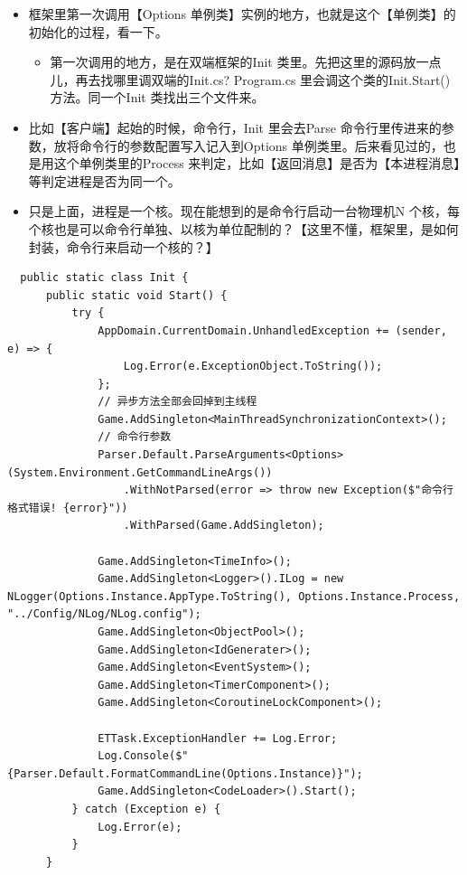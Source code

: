 \documentclass[9pt, b5paper]{article}
\begin{document}
\begin{itemize}
\item 框架里第一次调用【Options 单例类】实例的地方，也就是这个【单例类】的初始化的过程，看一下。
\begin{itemize}
\item 第一次调用的地方，是在双端框架的Init 类里。先把这里的源码放一点儿，再去找哪里调双端的Init.cs? Program.cs 里会调这个类的Init.Start() 方法。同一个Init 类找出三个文件来。
\end{itemize}
\item 比如【客户端】起始的时候，命令行，Init 里会去Parse 命令行里传进来的参数，放将命令行的参数配置写入记入到Options 单例类里。后来看见过的，也是用这个单例类里的Process 来判定，比如【返回消息】是否为【本进程消息】等判定进程是否为同一个。
\item 只是上面，进程是一个核。现在能想到的是命令行启动一台物理机N 个核，每个核也是可以命令行单独、以核为单位配制的？【这里不懂，框架里，是如何封装，命令行来启动一个核的？】
\end{itemize}
\begin{verbatim}
  public static class Init {
      public static void Start() {
          try {    
              AppDomain.CurrentDomain.UnhandledException += (sender, e) => {
                  Log.Error(e.ExceptionObject.ToString());
              };
              // 异步方法全部会回掉到主线程
              Game.AddSingleton<MainThreadSynchronizationContext>();
              // 命令行参数
              Parser.Default.ParseArguments<Options>(System.Environment.GetCommandLineArgs())
                  .WithNotParsed(error => throw new Exception($"命令行格式错误! {error}"))
                  .WithParsed(Game.AddSingleton);

              Game.AddSingleton<TimeInfo>();
              Game.AddSingleton<Logger>().ILog = new NLogger(Options.Instance.AppType.ToString(), Options.Instance.Process, "../Config/NLog/NLog.config");
              Game.AddSingleton<ObjectPool>();
              Game.AddSingleton<IdGenerater>();
              Game.AddSingleton<EventSystem>();
              Game.AddSingleton<TimerComponent>();
              Game.AddSingleton<CoroutineLockComponent>();

              ETTask.ExceptionHandler += Log.Error;
              Log.Console($"{Parser.Default.FormatCommandLine(Options.Instance)}");
              Game.AddSingleton<CodeLoader>().Start();
          } catch (Exception e) {
              Log.Error(e);
          }
      }
\end{verbatim}
\end{document}
